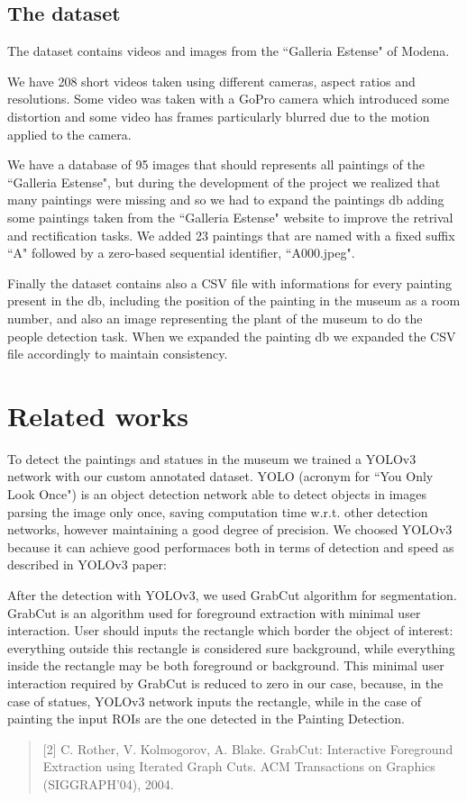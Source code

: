 \documentclass[10pt,twocolumn,letterpaper]{article}
\begin{document}
\subsection{The dataset}

The dataset contains videos and images from the ``Galleria Estense" of Modena.

We have 208 short videos taken using different cameras, aspect ratios and resolutions. 
Some video was taken with a GoPro camera which introduced some distortion and
some video has frames particularly blurred due to the motion applied to the camera.

We have a database of 95 images that should represents all paintings of the ``Galleria Estense", 
but during the development of the project we realized that many paintings were missing 
and so we had to expand the paintings db adding some paintings taken from the ``Galleria Estense" 
website to improve the retrival and rectification tasks. We added 23 paintings that are named 
with a fixed suffix ``A" followed by a zero-based sequential identifier, \eg ``A000.jpeg".

Finally the dataset contains also a CSV file with informations for every painting present
in the db, including the position of the painting in the museum as a room number, and also an image
representing the plant of the museum to do the people detection task. When we expanded the 
painting db we expanded the CSV file accordingly to maintain consistency.

\section{Related works}

To detect the paintings and statues in the museum we trained a YOLOv3 network with
our custom annotated dataset. YOLO (acronym for ``You Only Look Once") is an object detection
network able to detect objects in images parsing the image only once, saving computation time w.r.t. 
other detection networks, however maintaining a good degree of precision.
We choosed YOLOv3 because it can achieve good performaces
both in terms of detection and speed as described in YOLOv3 paper:
\begin{quote}
   \cite{yolov3}
\end{quote}

After the detection with YOLOv3, we used GrabCut algorithm for segmentation.
GrabCut is an algorithm used for foreground extraction with minimal user interaction.
User should inputs the rectangle which border the object of interest: everything outside this rectangle is considered sure background, while everything inside the rectangle may be both foreground or background.
This minimal user interaction required by GrabCut is reduced to zero in our case, because, in the case of statues, YOLOv3 network inputs the rectangle, while in the case of painting the input ROIs are the one detected in the Painting Detection.
\begin{quote}
[2] C. Rother, V. Kolmogorov, A. Blake. GrabCut: Interactive Foreground Extraction using Iterated Graph Cuts. ACM
Transactions on Graphics (SIGGRAPH'04), 2004.
\end{quote}
\end{document}
